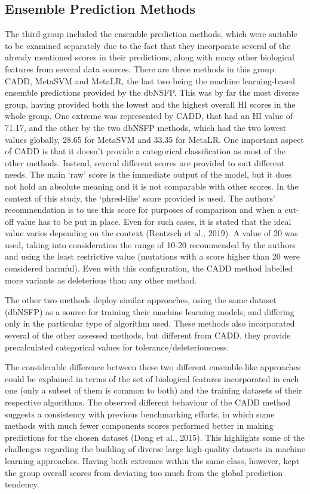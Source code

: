 \documentclass[12pt,MSc,wordcount,anon]{muthesis}
\begin{document}
\begin{flushleft}
\subsection{Ensemble Prediction Methods}

The third group included the ensemble prediction methods, which were suitable to be examined separately due to the fact that they incorporate several of the already mentioned scores in their predictions, along with many other biological features from several data sources. There are three methods in this group: CADD, MetaSVM and MetaLR, the last two being the machine learning-based ensemble predictions provided by the dbNSFP. This was by far the most diverse group, having provided both the lowest and the highest overall HI scores in the whole group. One extreme was represented by CADD, that had an HI value of 71.17, and the other by the two dbNSFP methods, which had the two lowest values globally, 28.65 for MetaSVM and 33.35 for MetaLR. One important aspect of CADD is that it doesn't provide a categorical classification as most of the other methods. Instead, several different scores are provided to suit different needs. The main `raw' score is the immediate output of the model, but it does not hold an absolute meaning and it is not comparable with other scores. In the context of this study, the `phred-like' score provided is used. The authors' recommendation is to use this score for purposes of comparison and when a cut-off value has to be put in place. Even for such cases, it is stated that the ideal value varies depending on the context (Rentzsch et al., 2019). A value of 20 was used, taking into consideration the range of 10-20 recommended by the authors and using the least restrictive value (mutations with a score higher than 20 were considered harmful). Even with this configuration, the CADD method labelled more variants as deleterious than any other method.

The other two methods deploy similar approaches, using the same dataset (dbNSFP) as a source for training their machine learning models, and differing only in the particular type of algorithm used. These methods also incorporated several of the other assessed methods, but different from CADD, they provide precalculated categorical values for tolerance/deleteriousness.

The considerable difference between these two different ensemble-like approaches could be explained in terms of the set of biological features incorporated in each one (only a subset of them is common to both) and the training datasets of their respective algorithms. The observed different behaviour of the CADD method suggests a consistency with previous benchmarking efforts, in which some methods with much fewer components scores performed better in making predictions for the chosen dataset (Dong et al., 2015). This highlights some of the challenges regarding the building of diverse large high-quality datasets in machine learning approaches. Having both extremes within the same class, however, kept the group overall scores from deviating too much from the global prediction tendency.


\end{flushleft}
\end{document}

